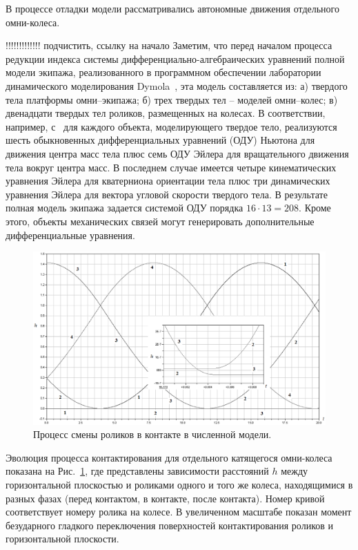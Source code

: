 
В процессе отладки модели рассматривались автономные движения отдельного 
омни-колеса.


!!!!!!!!!!!!! подчистить, ссылку на начало
Заметим, что перед началом процесса редукции индекса системы диф\-фе\-рен\-ци\-аль\-но-алгебраических уравнений полной модели экипажа, реализованного
в программном обеспечении лаборатории ди\-на\-ми\-чес\-ко\-го моделирования 
Dymola~\cite{Dymola}, эта модель составляется из: а) твердого тела платформы
омни--экипажа; б) трех твердых тел -- моделей омни--колес; в) двенадцати 
твердых тел роликов, размещенных на колесах. В соответствии, например, 
с~\cite{Kosenko2007} для каждого объекта, моделирующего твердое тело, 
реализуются шесть обыкновенных дифференциальных уравнений (ОДУ) Ньютона для
движения центра масс тела плюс семь ОДУ Эйлера для вращательного движения тела
вокруг центра масс. В последнем случае имеется четыре кинематических уравнения
Эйлера для кватерниона ориентации тела плюс три динамических уравнения Эйлера
для вектора угловой скорости твердого тела. В результате полная модель экипажа
задается системой ОДУ порядка $16\cdot 13=208$. Кроме этого, объекты 
механических связей могут генерировать дополнительные дифференциальные 
уравнения.

\begin{figure}[htb]
\centerline{\includegraphics[width=15cm]{content/parts/3_friction/nd/Figure11.eps}}
\caption{Процесс смены роликов в контакте в численной модели.}
\label{fig1}
\end{figure}

Эволюция процесса контактирования для отдельного катящегося омни-колеса 
показана на Рис.~\ref{fig1}, где представлены зависимости  расстояний 
$h$ между горизонтальной плоскостью и роликами 
одного и того же колеса, находящимися в разных фазах (перед контактом, в 
контакте, после контакта). Номер кривой соответствует номеру ролика на колесе. В увеличенном масштабе показан момент безударного гладкого 
переключения поверхностей контактирования роликов и горизонтальной плоскости.

